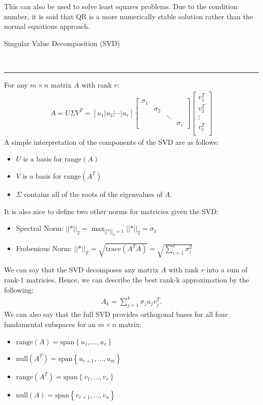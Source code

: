 \documentclass{article}
\newcommand{\header}[1]{\begin{large}\noindent #1\end{large}\\\rule{\textwidth}{0.5pt}}
\newcommand{\norm}[2]{\left\lvert\left\lvert#1\right\rvert\right\rvert}
\newcommand{\gap}{\medskip\\}
\newcommand{\curly}[1]{\left\{#1\right\}}
\newcommand{\range}{\textrm{range}}
\newcommand{\ds}{\displaystyle}
\begin{document}
This can also be used to solve least squares problems. Due to the condition number, it is said that
QR is a more numerically stable solution rather than the normal equations approach.
\gap
\header{Singular Value Decomposition (SVD)}
For any $m \times n$ matrix $A$ with rank $r$: 
\begin{align*}
    A = U\Sigma V^T = [u_1 | u_2 | \cdots | u_r] \begin{bmatrix}
        \sigma_1 & & &\\
        & \sigma_2 & & \\
        & & \ddots & \\
        & & & \sigma_r 
    \end{bmatrix}
    \begin{bmatrix}
        v_1^T \\
        v_2^T \\
        \vdots \\
        v_r^T \\
    \end{bmatrix}
\end{align*}
A simple interpretation of the components of the SVD are as follows:
\begin{itemize}
    \item $U$ is a basis for $\textrm{range}(A)$
    \item $V$ is a basis for $\textrm{range}(A^T)$
    \item $\Sigma$ contains all of the roots of the eigenvalues of $A$.
\end{itemize}
It is also nice to define two other norms for matricies given the SVD:
\begin{itemize}
    \item Spectral Norm: $\ds \norm*{A}_2 = \max_{\norm*{x}_2 = 1}\norm*{Ax}_2 = \sigma_1$
    \item Frobenious Norm: $\ds \norm*{A}_F = \sqrt{\textrm{trace}(A^TA)}= \sqrt{\sum_{i=1}^{r}\sigma_i^2}$
\end{itemize}
We can say that the SVD decomposes any matrix $A$ with rank $r$ into a sum of rank-1 matricies. Hence,
we can describe the best rank-k approximation by the following:
\begin{align*}
    A_k = \sum_{j = 1}^{k} \sigma_j u_j v_j^T.
\end{align*}
We can also say that the full SVD provides orthogonal bases for all four fundamental subspaces for an $m \times n$ matrix:
\begin{itemize}
    \item $\range(A) = \textrm{span}\curly{u_1, \ldots, u_r}$
    \item $\textrm{null}(A^T) = \textrm{span}\curly{u_{r + 1}, \ldots, u_m}$
    \item $\range(A^T) = \textrm{span}\curly{v_1, \ldots, v_r}$
    \item $\textrm{null}(A) = \textrm{span}\curly{v_{r + 1}, \ldots, v_n}$
\end{itemize}
\end{document}
